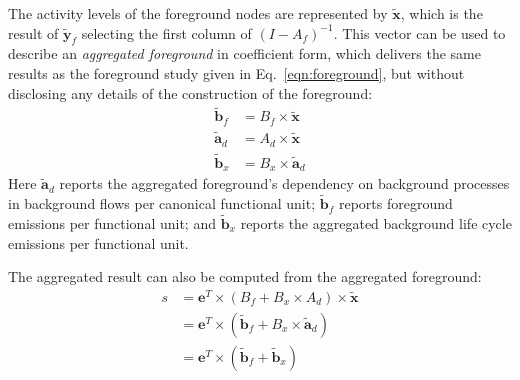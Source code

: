 The activity levels of the foreground nodes are represented by $\tilde{\mathbf{x}}$, which is the result of $\tilde{\mathbf{y}}_f$ selecting the first column of $(I-A_f)^{-1}$.
This vector can be used to describe an \emph{aggregated foreground} in coefficient form, which delivers the same results as the foreground study given in Eq.~\ref{eqn:foreground}, but without disclosing any details of the construction of the foreground:
\begin{equation}
\begin{array}{rl}
    \tilde{\mathbf{b}}_f & = B_f \times \tilde{\mathbf{x}} \\
    \tilde{\mathbf{a}}_d & = A_d \times \tilde{\mathbf{x}} \\
    \tilde{\mathbf{b}}_x & = B_x \times \tilde{\mathbf{a}}_d
\end{array}
\label{eqn:agg}
\end{equation}
Here $\tilde{\mathbf{a}}_d$ reports the aggregated foreground's dependency on background processes in background flows per canonical functional unit;  $\tilde{\mathbf{b}}_f$ reports foreground emissions per functional unit; and $\tilde{\mathbf{b}}_x$ reports the aggregated background life cycle emissions per functional unit.

The aggregated result can also be computed from the aggregated foreground:
\begin{equation}
\begin{array}{rl}
s & = \mathbf{e}^T \times( B_f + B_x \times A_d) \times \tilde{\mathbf{x}} \\
  & = \mathbf{e}^T \times( \tilde{\mathbf{b}}_f + B_x \times\tilde{\mathbf{a}}_d) \\
  & = \mathbf{e}^T \times( \tilde{\mathbf{b}}_f + \tilde{\mathbf{b}}_x) \\
\end{array}
\end{equation}
